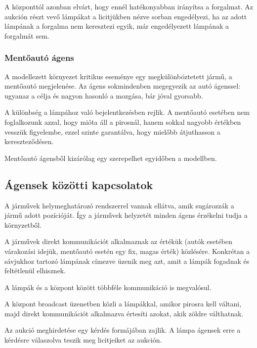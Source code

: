 \documentclass[a4paper, 11pt]{article}
\begin{document}
A központtól azonban elvárt, hogy ennél hatékonyabban irányítsa a forgalmat.
Az aukción részt vevő lámpákat a licitjükben nézve sorban engedélyezi, ha az adott lámpának a forgalma
nem keresztezi egyik, már engedélyezett lámpának a forgalmát sem.
\subsubsection{Mentőautó ágens}
A modellezett környezet kritikus eseménye egy megkülönböztetett jármű, a mentőautó megjelenése.
Az ágens sokmindenben megegyezik az autó ágenssel: ugyanaz a célja és nagyon hasonló a mozgása, bár jóval
gyorsabb.

A különbség a lámpához való bejelentkezésben rejlik. A mentőautó esetében nem foglalkozunk azzal,
hogy mióta áll a pirosnál, hanem sokkal nagyobb értékben vesszük figyelembe, ezzel szinte garantálva, hogy mielőbb
átjuthasson a kereszteződésen.

Mentőautó ágensből kizárólag egy szerepelhet egyidőben a modellben.

\subsection{Ágensek közötti kapcsolatok}
A járművek helymeghatározó rendszerrel vannak ellátva, amik sugározzák a jármű adott pozícióját. Így
a járművek helyzetét minden ágens érzékelni tudja a környzetből.

A járművek direkt kommunikációt alkalmaznak az értékük (autók esetében várakozási idejük, mentőautó
esetén egy fix, magas érték) közlésére. Konkrétan a sávjukhoz tartozó lámpának címezve üzenik meg azt,
amit a lámpák fogadnak és feltétlenül elhisznek.

A lámpák és a központ között többféle kommunikáció is megvalósul.

A központ broadcast üzenetben közli a lámpákkal, amikor pirosra kell váltani, majd direkt 
kommunikációt alkalmazva értesíti azokat, akik zöldre válthatnak.

Az aukció meghirdetése egy kérdés formájában zajlik. A lámpa ágensek erre a kérdésre válaszolva
teszik meg licitjeiket az aukción.
\end{document}
